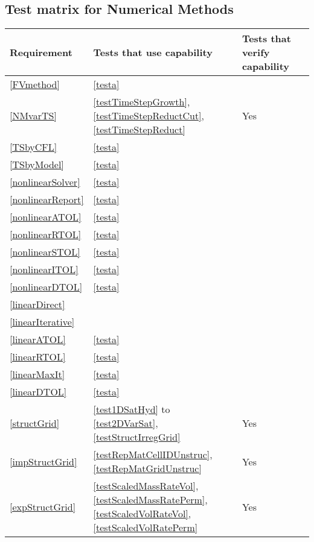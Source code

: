 \subsection{Test matrix for Numerical Methods}
\begin{tabular}{|l|l|l|l|}
	\hline
	Requirement & Tests that use capability & Tests that verify capability \\
	\hline
	\hline
	\ref{FVmethod} & \ref{testa} & \\
	\hline
	\ref{NMvarTS} & \ref{testTimeStepGrowth}, \ref{testTimeStepReductCut}, \ref{testTimeStepReduct} & Yes\\
	\hline
	\ref{TSbyCFL} & \ref{testa}& \\
	\hline
	\ref{TSbyModel} & \ref{testa} & \\
	\hline
	\ref{nonlinearSolver} & \ref{testa} &\\
	\hline
	\ref{nonlinearReport} & \ref{testa} &\\
	\hline
	\ref{nonlinearATOL} & \ref{testa} & \\
	\hline
	\ref{nonlinearRTOL} & \ref{testa} &\\
	\hline
	\ref{nonlinearSTOL} & \ref{testa} & \\
	\hline
	\ref{nonlinearITOL} & \ref{testa} &\\
	\hline
	\ref{nonlinearDTOL} & \ref{testa} &\\
	\hline
	\ref{linearDirect} &  &\\
	\hline
	\ref{linearIterative} &  &\\
	\hline
	\ref{linearATOL} & \ref{testa} &\\
	\hline
	\ref{linearRTOL} & \ref{testa} &\\
	\hline
	\ref{linearMaxIt} & \ref{testa} &\\
	\hline
	\ref{linearDTOL} & \ref{testa} &\\
	\hline
	\ref{structGrid} & \ref{test1DSatHyd} to \ref{test2DVarSat}, \ref{testStructIrregGrid} & Yes \\
	\hline
	\ref{impStructGrid} & \ref{testRepMatCellIDUnstruc}, \ref{testRepMatGridUnstruc} & Yes \\
	\hline
	\ref{expStructGrid} & \ref{testScaledMassRateVol}, \ref{testScaledMassRatePerm}, 
	\ref {testScaledVolRateVol}, \ref{testScaledVolRatePerm} & Yes\\
	\hline
\end{tabular}

